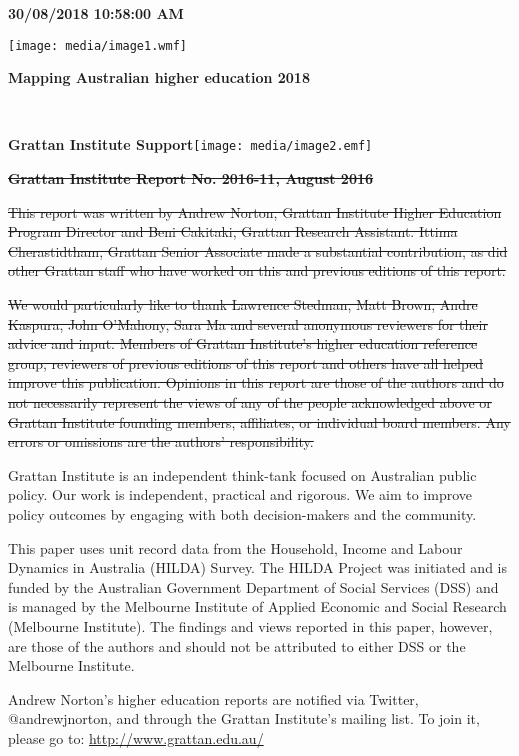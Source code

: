 \documentclass[]{book}
\date{}
\begin{document}
\textbf{30/08/2018 10:58:00 AM}

\texttt{[image: media/image1.wmf]}

\textbf{Mapping Australian higher education 2018 }

\textbf{\\
}

\textbf{Grattan Institute Support}\texttt{[image: media/image2.emf]}

\textbf{\sout{Grattan Institute Report No. 2016-11, August 2016}}

\sout{This report was written by Andrew Norton, Grattan Institute Higher Education Program Director and Beni Cakitaki, Grattan Research Assistant. Ittima Cherastidtham, Grattan Senior Associate made a substantial contribution, as did other Grattan staff who have worked on this and previous editions of this report. }

\sout{We would particularly like to thank Lawrence Stedman, Matt Brown, Andre Kaspura, John O'Mahony, Sara Ma and several anonymous reviewers for their advice and input. Members of Grattan Institute's higher education reference group, reviewers of previous editions of this report and others have all helped improve this publication. Opinions in this report are those of the authors and do not necessarily represent the views of any of the people acknowledged above or Grattan Institute founding members, affiliates, or individual board members. Any errors or omissions are the authors' responsibility.}

Grattan Institute is an independent think-tank focused on Australian public policy. Our work is independent, practical and rigorous. We aim to improve policy outcomes by engaging with both decision-makers and the community.

This paper uses unit record data from the Household, Income and Labour Dynamics in Australia (HILDA) Survey. The HILDA Project was initiated and is funded by the Australian Government Department of Social Services (DSS) and is managed by the Melbourne Institute of Applied Economic and Social Research (Melbourne Institute). The findings and views reported in this paper, however, are those of the authors and should not be attributed to either DSS or the Melbourne Institute.

Andrew Norton's higher education reports are notified via Twitter, @andrewjnorton, and through the Grattan Institute's mailing list. To join it, please go to: \url{http://www.grattan.edu.au/}
\end{document}
